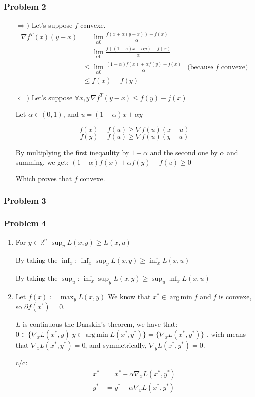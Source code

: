 \documentclass[12pt]{article}
\newcommand{\Q}[1]{\subsubsection*{Problem #1}}
\DeclareMathOperator*{\argmin}{arg\,min}
\begin{document}
\Q{2}

\begin{itemize}
\item[$\Rightarrow)$] Let's suppose $f$ convexe.
  \begin{align*}
    \nabla f^T(x) (y-x)
    &= \lim_{\alpha 0} \frac{f(x + \alpha(y-x)) - f(x)}{\alpha}
    \\&= \lim_{\alpha 0} \frac{f((1-\alpha)x + \alpha y) - f(x)}{\alpha}
    \\&\le \lim_{\alpha 0} \frac{(1-\alpha)f(x) + \alpha f(y) - f(x)}{\alpha} &\text{(because $f$ convexe)}
    \\&\le f(x) - f(y)
  \end{align*}
\item[$\Leftarrow)$] Let's suppose $\forall x, y \, \nabla f^T (y-x) \le f(y) - f(x)$
  
  Let $\alpha \in (0, 1)$, and $u = (1-\alpha)x + \alpha y$
  
  $$f(x) - f(u) \ge \nabla f(u) (x-u)$$
  $$f(y) - f(u) \ge \nabla f(u) (y-u)$$

  By multiplying the first ineqaulity by $1-\alpha$ and the second one by $\alpha$ and summing, we get:
  $(1-\alpha) f(x) + \alpha f(y) - f(u) \ge 0$

  Which proves that $f$ convexe.
\end{itemize}

\Q{3}

\Q{4}
\begin{enumerate}
\item
  For $y \in \mathbb R^n$
  $\sup_y L(x, y) \ge L(x, u)$

  By taking the $\inf_x$:
  $\inf_x \sup_y L(x, y) \ge \inf_x L(x, u)$

  By taking the $\sup_u$:
  $\inf_x \sup_y L(x, y) \ge \sup_u \inf_x L(x, u)$

\item

  Let $f(x) := \max_y L(x, y)$
  We know that $x^* \in \argmin f$ and $f$ is convexe,
  so $\partial f(x^*) = 0$.

  $L$ is continuous the Danskin's theorem, we have that:
  $0 \in \{ \nabla_x L (x^*, y) | y \in \argmin L(x^*, y^*) \} = \{ \nabla_x L (x^*, y^*) \}$ , wich means that
  $\nabla_x L (x^*, y^*) = 0$, and symmetrically, $\nabla_y L (x^*, y^*) = 0$.

  c/c:
  \begin{align*}
    x^* &= x^* - \alpha \nabla_x L (x^*, y^*)\\
    y^* &= y^* - \alpha \nabla_y L (x^*, y^*)
  \end{align*}
  
\end{enumerate}
\end{document}

